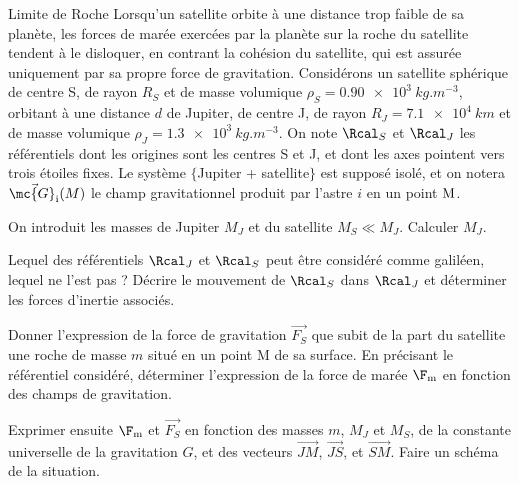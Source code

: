 \begin{exo}[PC][2][colle]{Limite de Roche}%
Lorsqu'un satellite orbite à une distance trop faible de sa planète, les forces de marée exercées par la planète sur la roche du satellite tendent à le disloquer, en contrant la cohésion du satellite, qui est assurée uniquement par sa propre force de gravitation. Considérons un satellite sphérique de centre S, de rayon $R_S$ et de masse volumique $\rho_S = \SI{0.90e3}{kg.m^{-3}}$, orbitant à une distance $d$ de Jupiter, de centre J, de rayon $R_J=\SI{7.1e4}{km}$ et de masse volumique $\rho_J = \SI{1.3e3}{kg.m^{-3}}$. On note $\Rcal_S$ et $\Rcal_J$ les référentiels dont les origines sont les centres S et J, et dont les axes pointent vers trois étoiles fixes. Le système $\{$Jupiter + satellite$\}$ est supposé isolé, et on notera $\Vec{\mc{G}_{\rm i}}(M)$ le champ gravitationnel produit par l’astre $i$ en un point $\rm M$.
\begin{quest}
\item On introduit les masses de Jupiter $M_J$ et du satellite $M_S \ll M_J$. Calculer $M_J$.


\item Lequel des référentiels $\Rcal_J$ et $\Rcal_S$ peut être considéré comme galiléen, lequel ne l'est pas ? Décrire le mouvement de $\Rcal_S$ dans $\Rcal_J$ et déterminer les forces d’inertie associés.



\item Donner l'expression de la force de gravitation $\Vec{F_S}$ que subit  de la part du satellite une roche de masse $m$ situé en un point M de sa surface. En précisant le référentiel considéré, déterminer l'expression de la force de marée $\F_{\rm m}$ en fonction des champs de gravitation. 
\item Exprimer ensuite $\F_{\rm m}$ et $\Vec{F_S}$ en fonction des masses $m$, $M_J$ et $M_S$, de la constante universelle de la gravitation $G$, et des vecteurs $\Vec{JM}$, $\Vec{JS}$, et $\Vec{SM}$. Faire un schéma de la situation.


\end{quest}
\end{exo}
